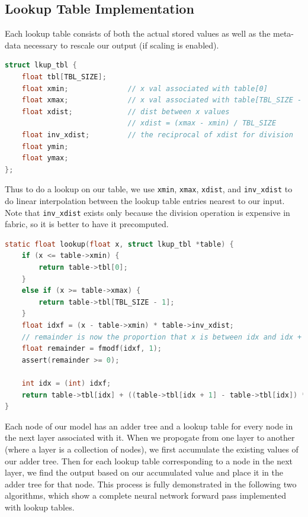 \documentclass[psamsfonts]{amsart}
\newcommand{\mycomment}[1]{}
\theoremstyle{definition}
\theoremstyle{remark}
\numberwithin{equation}{section}
\begin{document}
\subsection{Lookup Table Implementation}
Each lookup table consists of both the actual stored values as well as the meta-data necessary to rescale our output (if scaling is enabled).

\begin{lstlisting}[language=C]
struct lkup_tbl {
    float tbl[TBL_SIZE];
    float xmin;              // x val associated with table[0]
    float xmax;              // x val associated with table[TBL_SIZE - 1]
    float xdist;             // dist between x values 
                             // xdist = (xmax - xmin) / TBL_SIZE
    float inv_xdist;         // the reciprocal of xdist for division
    float ymin;
    float ymax;
};
\end{lstlisting}

Thus to do a lookup on our table, we use \texttt{xmin}, \texttt{xmax}, \texttt{xdist}, and \texttt{inv\_xdist} to do linear interpolation between the lookup table entries nearest to our input. Note that \texttt{inv\_xdist} exists only because the division operation is expensive in fabric, so it is better to have it precomputed.

\begin{lstlisting}[language=C]
static float lookup(float x, struct lkup_tbl *table) {
    if (x <= table->xmin) {
        return table->tbl[0];
    }
    else if (x >= table->xmax) {
        return table->tbl[TBL_SIZE - 1];
    }
    float idxf = (x - table->xmin) * table->inv_xdist;
    // remainder is now the proportion that x is between idx and idx + 1
    float remainder = fmodf(idxf, 1);
    assert(remainder >= 0);

    int idx = (int) idxf;
    return table->tbl[idx] + ((table->tbl[idx + 1] - table->tbl[idx]) * remainder);
}
\end{lstlisting}

Each node of our model has an adder tree and a lookup table for every node in the next layer associated with it. \mycomment{Say something like A layer is a collection of nodes; [the rest of the sentence]}When we propogate from one layer to another (where a layer is a collection of nodes), we first accumulate the existing values of our adder tree. Then for each lookup table corresponding to a node in the next layer, we find the output based on our accumulated value and place it in the adder tree for that node. This process is fully demonstrated in the following two algorithms, which show a complete neural network forward pass implemented with lookup tables.
\end{document}
